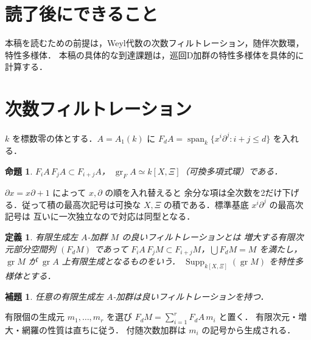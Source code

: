 \documentclass[a5paper,10pt,onecolumn]{jsarticle}
\makeatletter
\theoremstyle{mathnotetheorem}
\newtheorem{definition}[theorem]{定義}
\newtheorem{lemma}[theorem]{補題}
\newtheorem{proposition}[theorem]{命題}
\renewcommand{\proofname}{証明}
\renewenvironment{proof}[1][\proofname]{%
  \par\pushQED{\qed}\normalfont\topsep4\p@\@plus2\p@\relax
  \trivlist\item[\hskip\labelsep\bfseries #1]\ignorespaces
}{\popQED\endtrivlist\@endpefalse}
\makeatother
\begin{document}
\section*{読了後にできること}
本稿を読むための前提は，Weyl代数の次数フィルトレーション，随伴次数環，特性多様体．
本稿の具体的な到達課題は，巡回D加群の特性多様体を具体的に計算する．

\section{次数フィルトレーション}
$k$ を標数零の体とする．$A=A_1(k)$ に
$F_dA=\operatorname{span}_k\{x^i\partial^j:i+j\le d\}$ を入れる．
\begin{proposition}
$F_iA\,F_jA\subset F_{i+j}A$，
$\operatorname{gr}_F A\simeq k[X,\Xi]$（可換多項式環）である．
\end{proposition}
\begin{proof}
$\partial x=x\partial+1$ によって $x,\partial$ の順を入れ替えると
余分な項は全次数を2だけ下げる．従って積の最高次記号は可換な
$X,\Xi$ の積である．標準基底 $x^i\partial^j$ の最高次記号は
互いに一次独立なので対応は同型となる．
\end{proof}
\begin{definition}
有限生成左 $A$-加群 $M$ の良いフィルトレーションとは
増大する有限次元部分空間列 $(F_dM)$ であって
$F_iA\,F_jM\subset F_{i+j}M$，$\bigcup F_dM=M$ を満たし，
$\operatorname{gr}M$ が $\operatorname{gr}A$ 上有限生成となるものをいう．
$\operatorname{Supp}_{k[X,\Xi]}(\operatorname{gr}M)$ を特性多様体とする．
\end{definition}
\begin{lemma}
任意の有限生成左 $A$-加群は良いフィルトレーションを持つ．
\end{lemma}
\begin{proof}
有限個の生成元 $m_1,\ldots,m_r$ を選び
$F_dM=\sum_{i=1}^rF_dA\,m_i$ と置く．
有限次元・増大・網羅の性質は直ちに従う．
付随次数加群は $m_i$ の記号から生成される．
\end{proof}
\end{document}
